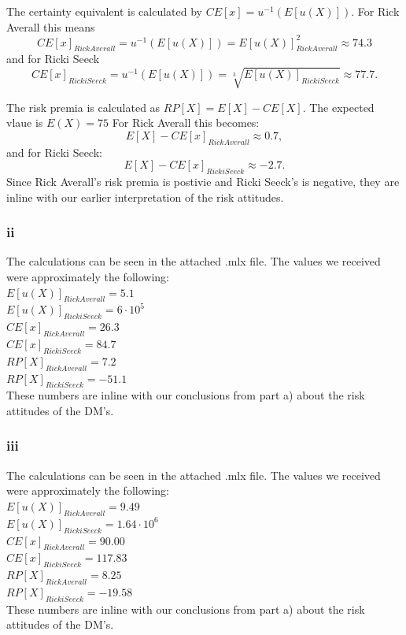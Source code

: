 \documentclass{article}
\begin{document}
	The certainty equivalent is calculated by $CE[x] = u^{-1}(E[u(X)])$. For Rick Averall this means
	\begin{equation}
		CE[x]_{Rick Averall} = u^{-1}(E[u(X)]) = E[u(X)]_{Rick Averall}^2 \approx 74.3
	\end{equation}
	and for Ricki Seeck 
		\begin{equation}
		CE[x]_{Ricki Seeck} = u^{-1}(E[u(X)]) = \sqrt[3]{E[u(X)]_{Ricki Seeck}} \approx 77.7.
	\end{equation}

	The risk premia is calculated as $RP[X] = E[X] - CE[X]$. The expected vlaue is $E(X) = 75$ 
	For Rick Averall this becomes:
	\begin{equation}
		E[X] - CE[x]_{Rick Averall} \approx 0.7,
	\end{equation}
	and for Ricki Seeck:
		\begin{equation}
		E[X] - CE[x]_{Ricki Seeck} \approx -2.7.
	\end{equation}
	Since Rick Averall's risk premia is postivie and Ricki Seeck's is negative, they are inline with our earlier interpretation of the risk attitudes.
\subsubsection{ii}
	The calculations can be seen in the attached .mlx file. The values we received were approximately the following:\\
	$E[u(X)]_{Rick Averall} = 5.1$ \\
	$E[u(X)]_{Ricki Seeck} = 6\cdot10^5$\\
	$CE[x]_{Rick Averall} = 26.3 $ \\
	$CE[x]_{Ricki Seeck} = 84.7$ \\
	$RP[X]_{Rick Averall} = 7.2$ \\
	$RP[X]_{Ricki Seeck} = -51.1$ \\
	These numbers are inline with our conclusions from part a) about the risk attitudes of the DM's.
\subsubsection{iii}
	The calculations can be seen in the attached .mlx file. The values we received were approximately the following:\\
	$E[u(X)]_{Rick Averall} = 9.49$ \\
	$E[u(X)]_{Ricki Seeck} = 1.64\cdot10^6$\\
	$CE[x]_{Rick Averall} = 90.00 $ \\
	$CE[x]_{Ricki Seeck} = 117.83$ \\
	$RP[X]_{Rick Averall} = 8.25$ \\
	$RP[X]_{Ricki Seeck} = -19.58$ \\
	These numbers are inline with our conclusions from part a) about the risk attitudes of the DM's.
\end{document}
